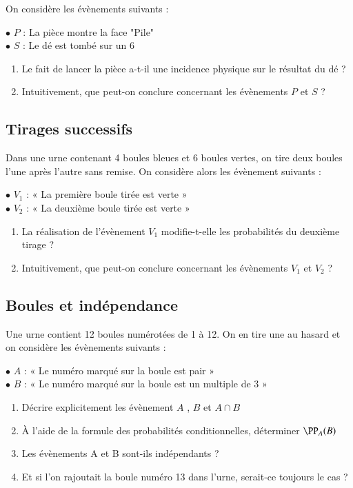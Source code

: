 \documentclass[oneside,12pt]{article}          %
\begin{document}
On considère les évènements suivants : 

$\bullet$ $P$ : \og La pièce montre la face "Pile" \fg \\
$\bullet$ $S$ : \og Le dé est tombé sur un 6 \fg 
\begin{enumerate}
	\item Le fait de lancer la pièce a-t-il une incidence physique sur le résultat du dé ?
	\item Intuitivement, que peut-on conclure concernant les évènements $P$ et $S$ ?
\end{enumerate}



\subsection{Tirages successifs}
Dans une urne contenant 4 boules bleues et 6 boules vertes, on tire deux boules l'une après l'autre sans remise. On considère alors les évènement suivants :

$\bullet$  $V_1$ : « La première boule tirée est verte »\\
$\bullet$  $V_2$ : « La deuxième boule tirée est verte »
\begin{enumerate}
	\item La réalisation de l'évènement $V_1$ modifie-t-elle les probabilités du deuxième tirage ?
	\item Intuitivement, que peut-on conclure concernant les évènements $V_1$ et $V_2$ ?
\end{enumerate}



\subsection{Boules et indépendance}
Une urne contient 12 boules numérotées de 1 à 12. On en tire une au hasard et on considère les évènements suivants :

$\bullet$  $A$ : « Le numéro marqué sur la boule est pair » \\
$\bullet$  $B$ : « Le numéro marqué sur la boule est un multiple de 3 »
\begin{enumerate}
	\item Décrire explicitement les évènement $A$ , $B$ et $A \cap B$
	\item À l'aide de la formule des probabilités conditionnelles, déterminer $\PP_A(B)$
    \item Les évènements A et B sont-ils indépendants ?
    \item Et si l'on rajoutait la boule numéro 13 dans l'urne, serait-ce toujours le cas ?
\end{enumerate}
\end{document}
